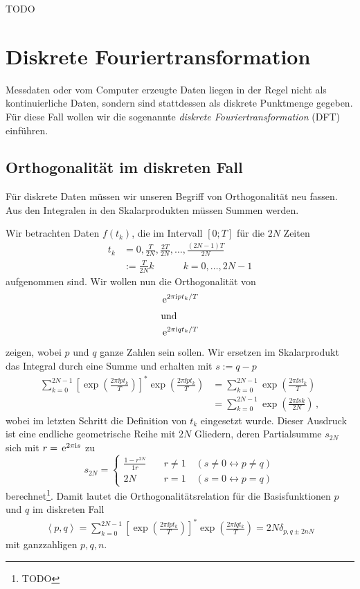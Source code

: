 \documentclass[paper=a4, fontsize=11.0pt, abstractoff, DIV12]{scrartcl}
\begin{document}
TODO

\section{Diskrete Fouriertransformation}

Messdaten oder vom Computer erzeugte Daten liegen in der Regel nicht als
kontinuierliche Daten, sondern sind stattdessen als diskrete Punktmenge
gegeben. Für diese Fall wollen wir die sogenannte \emph{diskrete
Fouriertransformation} (DFT) einführen.

\subsection{Orthogonalität im diskreten Fall}

Für diskrete Daten müssen wir unseren Begriff von Orthogonalität neu fassen.
Aus den Integralen in den Skalarprodukten müssen Summen werden.

Wir betrachten Daten $f(t_k)$, die im Intervall $[0;T]$ für die $2N$ Zeiten
\begin{align}
t_k &= 0, \frac{T}{2N}, \frac{2T}{2N},\dots,\frac{(2N-1)T}{2N}\nonumber\\
&:=\frac{T}{2N}k\qquad\quad k=0,\dots,2N-1
\end{align}
aufgenommen sind. Wir wollen nun die Orthogonalität von
\begin{align*}
\,{\mathrm{e}}^{2\pi \mathrm{i} p t_k/T}\\
\intertext{und}
\,{\mathrm{e}}^{2\pi \mathrm{i} q t_k/T}
\end{align*}
zeigen, wobei $p$ und $q$ ganze Zahlen sein sollen. Wir ersetzen im Skalarprodukt
das Integral durch eine Summe und erhalten mit $s:=q-p$
\begin{align}
\sum\limits_{k=0}^{2N-1}\left[\exp{\left(\frac{2\pi\ii pt_k}{T}\right)} \right]^* \exp{\left(\frac{2\pi\ii pt_k}{T}\right)} &= \sum\limits_{k=0}^{2N-1}\exp{\left(\frac{2\pi\ii st_k}{T}\right)}\\
&=\sum\limits_{k=0}^{2N-1}\exp{\left(\frac{2\pi\ii sk}{2N}\right)}\,,
\end{align}
wobei im letzten Schritt die Definition von $t_k$ eingesetzt wurde. Dieser
Ausdruck ist eine endliche geometrische Reihe mit $2N$ Gliedern, deren
Partialsumme $s_{2N}$ sich mit $r=\,{\mathrm{e}}^{2\pi\mathrm{i} s}$ zu
\begin{equation}
s_{2N} = \left\{ \begin{array}{lr}\frac{1-r^{2N}}{1r}  & \quad r\ne 1\quad (s\ne 0 \leftrightarrow p \ne q)\\2N &\quad r=1\quad(s = 0 \leftrightarrow p = q)\end{array}\right.
\end{equation}
berechnet\footnote{TODO}. Damit lautet die Orthogonalitätsrelation für die
Basisfunktionen $p$ und $q$ im diskreten Fall
\begin{align}
\left<p,q\right>=\sum\limits_{k=0}^{2N-1} \left[\exp\left(\frac{2\pi\ii pt_k}{T}\right)\right]^*\exp\left(\frac{2\pi\ii qt_k}{T}\right) = 2N\delta_{p,q\pm 2nN}
\label{eq:diskOrth}
\end{align}
mit ganzzahligen $p,q,n$.
\end{document}
